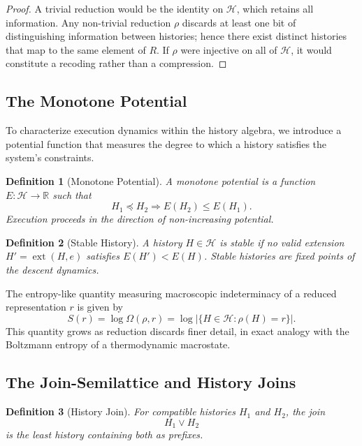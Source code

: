 \documentclass[12pt]{article}
\newtheorem{definition}{Definition}
\begin{document}
\begin{proof}
A trivial reduction would be the identity on $\mathcal{H}$, which retains all information. Any
non-trivial reduction $\rho$ discards at least one bit of distinguishing information between
histories; hence there exist distinct histories that map to the same element of $R$. If $\rho$
were injective on all of $\mathcal{H}$, it would constitute a recoding rather than a
compression.
\end{proof}

\subsection{The Monotone Potential}

To characterize execution dynamics within the history algebra, we introduce a potential
function that measures the degree to which a history satisfies the system's constraints.

\begin{definition}[Monotone Potential]
A \emph{monotone potential} is a function $E : \mathcal{H} \rightarrow \mathbb{R}$ such that
\[
H_1 \preceq H_2 \Rightarrow E(H_2) \leq E(H_1).
\]
Execution proceeds in the direction of non-increasing potential.
\end{definition}

\begin{definition}[Stable History]
A history $H \in \mathcal{H}$ is \emph{stable} if no valid extension $H' = \operatorname{ext}(H, e)$
satisfies $E(H') < E(H)$. Stable histories are fixed points of the descent dynamics.
\end{definition}

The entropy-like quantity measuring macroscopic indeterminacy of a reduced representation $r$
is given by
\[
S(r) = \log \Omega(\rho, r) = \log \left| \{ H \in \mathcal{H} : \rho(H) = r \} \right|.
\]
This quantity grows as reduction discards finer detail, in exact analogy with the Boltzmann
entropy of a thermodynamic macrostate.

\subsection{The Join-Semilattice and History Joins}

\begin{definition}[History Join]
For compatible histories $H_1$ and $H_2$, the join
\[
H_1 \vee H_2
\]
is the least history containing both as prefixes.
\end{definition}
\end{document}
